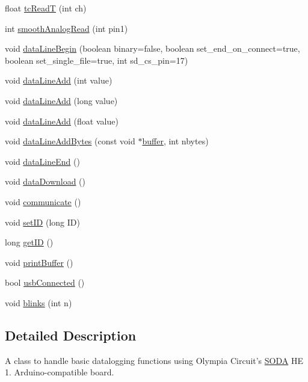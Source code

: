 \begin{DoxyCompactItemize}
float \hyperlink{class_s_o_d_a_aeb776ca678f15e50781f031cb3f880d6}{tc\-Read\-T} (int ch)
\item 
int \hyperlink{class_s_o_d_a_a55eaa23fbeb729b6d348a0d6c4e3c9b3}{smooth\-Analog\-Read} (int pin1)
\item 
void \hyperlink{class_s_o_d_a_a8fe9975e114931740d379a3385f0ea3d}{data\-Line\-Begin} (boolean binary=false, boolean set\-\_\-end\-\_\-on\-\_\-connect=true, boolean set\-\_\-single\-\_\-file=true, int sd\-\_\-cs\-\_\-pin=17)
\item 
void \hyperlink{class_s_o_d_a_a00647a29fb7b491d5e455b8b099da5e0}{data\-Line\-Add} (int value)
\item 
void \hyperlink{class_s_o_d_a_a1c38451ceb71b3e644eb16c11fcfacd7}{data\-Line\-Add} (long value)
\item 
void \hyperlink{class_s_o_d_a_aa5263a65ba6929e23c85bc0d47bbae32}{data\-Line\-Add} (float value)
\item 
void \hyperlink{class_s_o_d_a_ae41f4913152b2a84fadc563f9beb1de5}{data\-Line\-Add\-Bytes} (const void $\ast$\hyperlink{_s_o_d_a_8cpp_abb3fb3c13325b6f5206e79234aea8772}{buffer}, int nbytes)
\item 
void \hyperlink{class_s_o_d_a_a3bdf9101301e2781fe899cb52a59820b}{data\-Line\-End} ()
\item 
void \hyperlink{class_s_o_d_a_a6a65882362bba508fbc8c0d5e45badc1}{data\-Download} ()
\item 
void \hyperlink{class_s_o_d_a_a15a8c710209fd041f14bb448fd17c9b2}{communicate} ()
\item 
void \hyperlink{class_s_o_d_a_aa79b275be71dbfd5662608add4715b87}{set\-I\-D} (long I\-D)
\item 
long \hyperlink{class_s_o_d_a_a01ecfd6c2f14d0f5507a4384b34fb46a}{get\-I\-D} ()
\item 
void \hyperlink{class_s_o_d_a_af1e78fa91c8cb363a93320acaacf0e7f}{print\-Buffer} ()
\item 
bool \hyperlink{class_s_o_d_a_a5ef9772aba25fe5b19bc0d647d8c899a}{usb\-Connected} ()
\item 
void \hyperlink{class_s_o_d_a_af1752112fc06931fa9634f48cf65e420}{blinks} (int n)
\end{DoxyCompactItemize}


\subsection{Detailed Description}
A class to handle basic datalogging functions using Olympia Circuit's \hyperlink{class_s_o_d_a}{S\-O\-D\-A} H\-E 1. Arduino-\/compatible board. 

